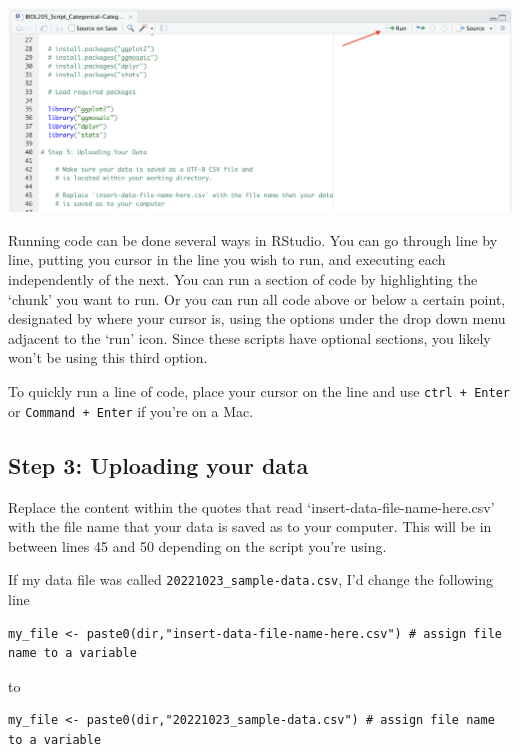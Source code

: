 \documentclass[
]{book}
\begin{document}
\includegraphics{images/run_button.png}

Running code can be done several ways in RStudio. You can go through line by line, putting you cursor in the line you wish to run, and executing each independently of the next. You can run a section of code by highlighting the `chunk' you want to run. Or you can run all code above or below a certain point, designated by where your cursor is, using the options under the drop down menu adjacent to the `run' icon. Since these scripts have optional sections, you likely won't be using this third option.

To quickly run a line of code, place your cursor on the line and use \texttt{ctrl\ +\ Enter} or \texttt{Command\ +\ Enter} if you're on a Mac.

\hypertarget{step-3-uploading-your-data}{%
\subsection*{Step 3: Uploading your data}\label{step-3-uploading-your-data}}

Replace the content within the quotes that read `insert-data-file-name-here.csv' with the file name that your data is saved as to your computer. This will be in between lines 45 and 50 depending on the script you're using.

If my data file was called \texttt{20221023\_sample-data.csv}, I'd change the following line

\begin{verbatim}
my_file <- paste0(dir,"insert-data-file-name-here.csv") # assign file name to a variable
\end{verbatim}

to

\begin{verbatim}
my_file <- paste0(dir,"20221023_sample-data.csv") # assign file name to a variable
\end{verbatim}
\end{document}
